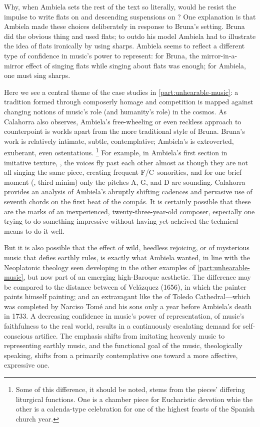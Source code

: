 Why, when Ambiela sets the rest of the text so literally, would he resist the impulse to write flats on  and descending suspensions on ?
One explanation is that Ambiela made these choices deliberately in response to Bruna's setting. 
Bruna did the obvious thing and used flats; to outdo his model Ambiela had to illustrate the idea of flats ironically by using sharps. 
Ambiela seems to reflect a different type of confidence in music's power to represent: for Bruna, the mirror-in-a-mirror effect of singing flats while singing about flats was enough; for Ambiela, one must sing sharps. 

Here we see a central theme of the case studies in \cref{part:unhearable-music}: a tradition formed through composerly homage and competition is mapped against changing notions of music's role (and humanity's role) in the cosmos. 
As Calahorra also observes, Ambiela's free-wheeling or even reckless approach to counterpoint is worlds apart from the more traditional style of Bruna.
Bruna's work is relatively intimate, subtle, contemplative; Ambiela's is extroverted, exuberant, even ostentatious.%
	\footnote{%
	Some of this difference, it should be noted, stems from the pieces' differing liturgical functions. 
	One is a chamber piece for Eucharistic devotion whie the other is a calenda-type celebration for one of the highest feasts of the Spanish church year.
	}
For example, in Ambiela's first section in imitative texture, , the voices fly past each other almost as though they are not all singing the same piece, creating frequent F\na/C\sh\ sonorities, and for one brief moment (, third minim) only the pitches A, G, and D are sounding.
Calahorra provides an analysis of Ambiela's abruptly shifting cadences and pervasive use of seventh chords on the first beat of the compás.
It is certainly possible that these are the marks of an inexperienced, twenty-three-year-old composer, especially one trying to do something impressive without having yet acheived the technical means to do it well.

But it is also possible that the effect of wild, heedless rejoicing, or of mysterious music that defies earthly rules, is exactly what Ambiela wanted, in line with the Neoplatonic theology seen developing in the other examples of \cref{part:unhearable-music}, but now part of an emerging high-Baroque aesthetic.
The difference may be compared to the distance between  of Velázquez (1656), in which the painter paints himself painting; and an extravagant  like the  of Toledo Cathedral---which was completed by Narciso Tomé and his sons only a year before Ambiela's death in 1733.
A decreasing confidence in music's power of representation, of music's faithfulness to the real world, results in a continuously escalating demand for self-conscious artifice.
The emphasis shifts from imitating heavenly music to representing earthly music, and the functional goal of the music, theologically speaking, shifts from a primarily contemplative one toward a more affective, expressive one.


